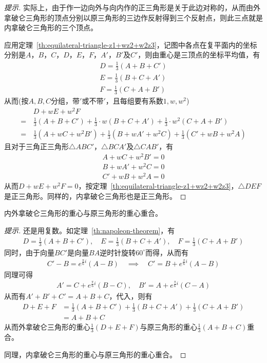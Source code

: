 \begin{proof}[提示]
  实际上，由于作一边向外与向内作的正三角形是关于此边对称的，从而由外拿破仑三角形的顶点分别以原三角形的三边作反射得到三个反射点，则此三点就是内拿破仑三角形的三个顶点。

  应用定理~\ref{th:equilateral-triangle-z1+wz2+w2z3}，记图中各点在复平面内的坐标分别是$A$，$B$，$C$，$D$，$E$，$F$，$A'$，$B'$及$C'$，则由重心是三顶点的坐标平均值，有
  \begin{align*}
    D = \frac13\left(A+B+C'\right)\\
    E = \frac13\left(B+C+A'\right)\\
    F = \frac13\left(C+A+B'\right)
  \end{align*}
  从而(按$A,B,C$分组，带$'$或不带$'$，且每组要有系数$1,w,w^2$)
  \begin{align*}
    &D + wE + w^2F \\
    =\,& \frac13\left(A+B+C'\right)
    + \frac13\cdot w\left(B+C+A'\right)
       + \frac13\cdot w^2\left(C+A+B'\right)\\
    =\,&\frac13\left( A + wC + w^2B' \right) + \frac13\left( B + wA' + w^2C \right)
       + \frac13\left( C' + wB + w^2A \right)
  \end{align*}
  且对于三角正三角形$\triangle ABC'$，$\triangle BCA'$及$\triangle CAB'$，有
    \begin{align*}
    A + wC + w^2 B' = 0\\
    B + wA' + w^2 C = 0\\
    C' + wB + w^2 A = 0
  \end{align*}
  从而$D+wE+w^2F=0$，按定理~\ref{th:equilateral-triangle-z1+wz2+w2z3}，$\triangle DEF$是正三角形。同样的，内拿破仑三角形也是正三角形。
\end{proof}

\begin{example}
  内外拿破仑三角形的重心与原三角形的重心重合。
\end{example}
\begin{proof}[提示]
  还是用复数。如定理~\ref{th:napoleon-theorem}，有
  \begin{align*}
    D = \frac13\left(A+B+C'\right),\quad
    E = \frac13\left(B+C+A'\right),\quad
    F = \frac13\left(C+A+B'\right)
  \end{align*}
  同时，由于向量$BC'$是向量$BA$逆时针旋转$60^\circ$而得，从而有
  \begin{align*}
    C'-B=e^{\frac{\pi}6 i} (A-B) \quad\implies\quad C' = B + e^{\frac{\pi}6 i} (A-B)    
  \end{align*}
  同理可得
  \begin{align*}
    A' = C + e^{\frac{\pi}6 i} (B-C),\quad
    B' = A + e^{\frac{\pi}6 i} (C-A)
  \end{align*}
  从而有$A'+B'+C' = A+B+C$，代入，则有
  \begin{align*}
    D + E + F & = \frac13\left(A+B+C'\right) + \frac13\left(B+C+A'\right) + \frac13\left(C+A+B'\right) \\
              & = A + B + C
  \end{align*}
  从而外拿破仑三角形的重心$\frac13(D+E+F)$与原三角形的重心$\frac13(A+B+C)$重合。

  同理，内拿破仑三角形的重心与原三角形的重心重合。
\end{proof}


